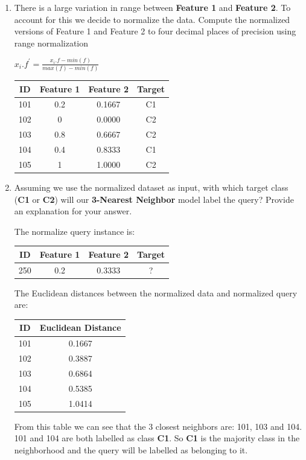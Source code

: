 \documentclass[solution]{ditpaper}
\begin{document}
\begin{enumerate}
\begin{enumerate}
\begin{answer}
				\end{answer}
			\item There is a large variation in range between \textbf{Feature 1} and \textbf{Feature 2}. To account for this we decide to normalize the data. Compute the normalized versions of Feature 1 and Feature 2  to four decimal places of precision using range normalization 
								\begin{center}
								$x_i.f^\prime=\frac{x_i.f - min(f)}{max(f)-min(f)}$
								\end{center}		
				\begin{answer}
					\begin{center}
\begin{tabular}{|c|c|c|c|}
\hline
ID & Feature 1 & Feature 2  & Target \\
\hline
101 &	0.2 &	 0.1667 &	C1\\
102 &	0    & 	0.0000 &	C2\\
103 &	0.8 & 	0.6667 &	C2\\
104 &	0.4 &	   0.8333 &	C1\\
105 &	1    & 	1.0000 &	C2\\
\hline
\end{tabular}
					\end{center}
				\end{answer}
			\item Assuming we use the normalized dataset as input, with which target class (\textbf{C1}  or \textbf{C2}) will our \textbf{3-Nearest Neighbor} model label the query? Provide an explanation for your answer.				
				\begin{answer}
					The normalize query instance is:
\begin{center}
\begin{tabular}{|c|c|c|c|}
\hline
ID & Feature 1 & Feature 
2  & Target \\
\hline
250 & 0.2 & 0.3333 & ?\\
\hline
\end{tabular}
\end{center}
				The Euclidean distances between the normalized data and normalized query are: 
					\begin{center}
						\begin{tabular}{|c|c|}
						ID & Euclidean Distance \\
						\hline
101	& 0.1667\\
102	& 0.3887\\
103	& 0.6864\\
104	& 0.5385\\
105	&1.0414\\						
\hline
						\end{tabular}
					\end{center}
From this table we can see that the 3 closest neighbors are: 101, 103 and 104. 101 and 104 are both labelled as class \textbf{C1}. So \textbf{C1} is the majority class in the neighborhood and the query will be labelled as belonging to it.					
				\end{answer}	
		\end{enumerate}
		

\end{enumerate}
\end{document}
